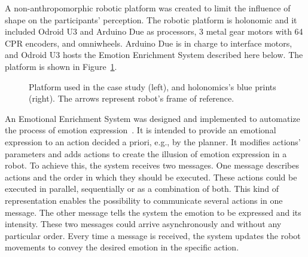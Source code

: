 A non-anthropomorphic robotic platform was created to limit the influence of shape on the participants' perception. The robotic platform is holonomic and it included Odroid U3 and Arduino Due as processors, 3 metal gear motors with 64 CPR encoders, and omniwheels. Arduino Due is in charge to interface motors, and Odroid U3 hosts the Emotion Enrichment System described here below.
The platform is shown in Figure~\ref{fig:Robot}.

\begin{figure}[t]
\centering%
\hspace{2mm}
\caption{Platform used in the case study (left), and holonomics's blue prints (right). The arrows represent robot's frame of reference.
\label{fig:Robot}}
\end{figure}

An Emotional Enrichment System was designed and implemented to automatize the process of emotion expression~\cite{Angel2017}. It is intended to provide an emotional expression to an action decided a priori, e.g., by the planner. It modifies actions' parameters and adds actions to create the illusion of emotion expression in a robot. To achieve this, the system receives two messages. One message describes actions and the order in which they should be executed. These actions could be executed in parallel, sequentially or as a combination of both. This kind of representation enables the possibility to communicate several actions in one message. The other message tells the system the emotion to be expressed and its intensity. These two messages could arrive asynchronously and without any particular order. Every time a message is received, the system updates the robot movements to convey the desired emotion in the specific action.

